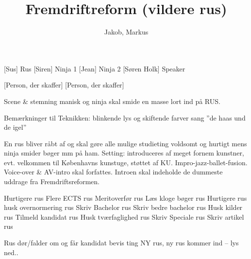 \documentclass[a4paper,11pt]{article}
\title{Fremdriftreform (vildere rus)}
\author{Jakob, Markus}
\begin{document}
\maketitle

\begin{roles}
    [Sus] Rus
    [Siren] Ninja 1
[Jean] Ninja 2
    [Søren Holk] Speaker
\end{roles}

\begin{props}
    [Person, der skaffer]
    [Person, der skaffer]
\end{props}

\scene
Scene \& stemning
manisk og ninja skal smide en masse lort ind på RUS.

Bemærkninger til Teknikken:
blinkende lys og skiftende farver
sang ”de haas und de igel”

\begin{sketch}

\scene
En rus bliver råbt af og skal gøre alle mulige studieting voldsomt og hurtigt mens ninja smider 
bøger mm på ham.
Setting: introduceres af meget fornem kunstner, evt. velkommen til Københavns kunstuge, støttet af KU. Impro-jazz-ballet-fusion. Voice-over \& AV-intro skal forfattes. Introen skal indeholde de dummeste uddrage fra Fremdriftsreformen.




Hurtigere rus
Flere ECTS rus
Meritoverfør rus
Læs kloge bøger rus
Hurtigere rus
husk overnormering rus
Skriv Bachelor rus 
Skriv bedre bachelor rus
Husk kilder rus
Tilmeld kandidat rus
Husk tværfaglighed rus
Skriv Speciale rus
Skriv artikel rus

\scene Rus dør/falder om og får kandidat bevis ting
NY rus, ny rus kommer ind – lys ned..


\end{sketch}
\end{document}
